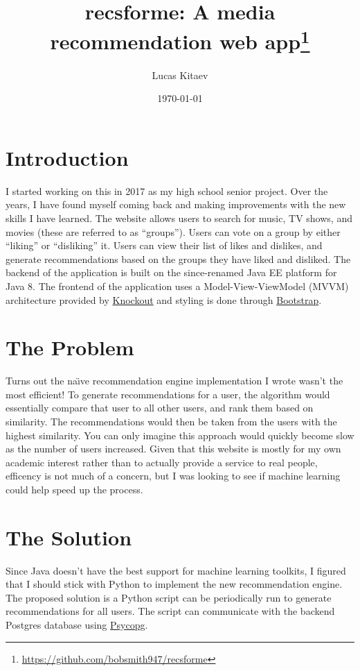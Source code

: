 \documentclass[12pt]{article}
\title{recsforme: A media recommendation web app\thanks{\url{https://github.com/bobsmith947/recsforme}}}
\author{Lucas Kitaev}
\date{\today}
\begin{document}
	\maketitle

	\section*{Introduction}
	I started working on this in 2017 as my high school senior project. Over the years, I have found myself coming back and making improvements with the new skills I have learned. The website allows users to search for music, TV shows, and movies (these are referred to as ``groups''). Users can vote on a group by either ``liking'' or ``disliking'' it. Users can view their list of likes and dislikes, and generate recommendations based on the groups they have liked and disliked. The backend of the application is built on the since-renamed Java EE platform for Java 8. The frontend of the application uses a Model-View-ViewModel (MVVM) architecture provided by \href{https://knockoutjs.com/}{Knockout} and styling is done through \href{https://getbootstrap.com/}{Bootstrap}.

	\section*{The Problem}
	Turns out the na\"{\i}ve recommendation engine implementation I wrote wasn't the most efficient! To generate recommendations for a user, the algorithm would essentially compare that user to all other users, and rank them based on similarity. The recommendations would then be taken from the users with the highest similarity. You can only imagine this approach would quickly become slow as the number of users increased. Given that this website is mostly for my own academic interest rather than to actually provide a service to real people, efficency is not much of a concern, but I was looking to see if machine learning could help speed up the process.

	\newpage

	\section*{The Solution}
	Since Java doesn't have the best support for machine learning toolkits, I figured that I should stick with Python to implement the new recommendation engine. The proposed solution is a Python script can be periodically run to generate recommendations for all users. The script can communicate with the backend Postgres database using \href{https://www.psycopg.org/}{Psycopg}.
\end{document}
